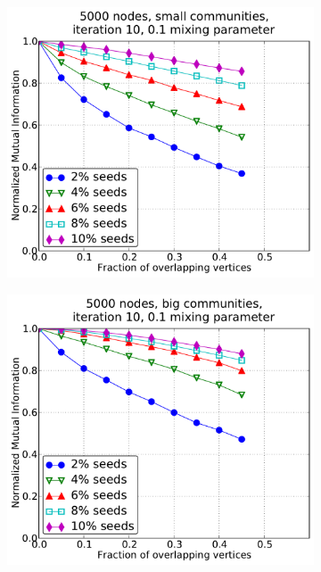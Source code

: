\begin{figure}[h!]
    \centering
    \begin{subfigure}{0.55\textwidth}
    \centering
    \includegraphics[width=\plotwidth]{plots/overlap_iter_1mu_c.pdf}
    \end{subfigure}%
    \begin{subfigure}{0.55\textwidth}
    \centering
    \includegraphics[width=\plotwidth]{plots/overlap_iter_1mu_d.pdf}

\end{subfigure}
\end{figure}
